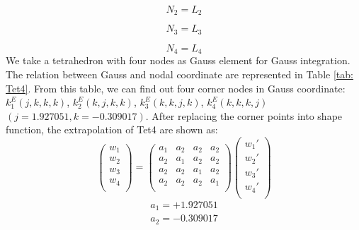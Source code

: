 \begin{equation}
N_2 = L_2
\end{equation}

\begin{equation}
N_3 = L_3
\end{equation}

\begin{equation}
N_4 = L_4
\end{equation}
 We take a tetrahedron with four nodes as Gauss element for Gauss integration. The relation between Gauss and nodal coordinate are represented in Table \ref{tab: Tet4}. From this table, we can find out four corner nodes in Gauss coordinate: $k_1^E(j, k, k, k)$, $k_2^E(k, j, k, k)$, $k_3^E(k, k, j, k)$, $k_4^E(k, k, k, j)$ $(j=1.927051, k=-0.309017)$. After replacing the corner points into shape function, the extrapolation of Tet4 are shown as:
\begin{equation}
\begin{pmatrix}
w_1 \\
w_2 \\
w_3 \\
w_4 \\
\end{pmatrix} = \begin{pmatrix}
a_1 & a_2 &  a_2 &  a_2      \\[0.3em]
a_2 & a_1 &  a_2 &  a_2      \\[0.3em]
a_2 & a_2 &  a_1 &  a_2      \\[0.3em]
a_2 & a_2 &  a_2 &  a_1      \\[0.3em]
\end{pmatrix} \begin{pmatrix}
{w_1}' \\
{w_2}' \\
{w_3}' \\
{w_4}' \\
\end{pmatrix}
\end{equation}	
\begin{align*}
a_1 = +1.927051 \\
a_2 = -0.309017 \\
\end{align*}



